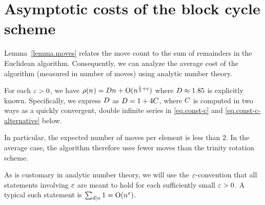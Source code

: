   \section{Asymptotic costs of the block cycle scheme}\label{sec.restglied}
  Lemma~\ref{lemma.moves} relates the move count to the sum of remainders
  in the Euclidean algorithm. Consequently, 
  we can analyze the average cost of the algorithm (measured in number
  of moves) using  analytic number theory. 
  \begin{theorem}\label{thm.main}
    For each $\varepsilon>0$, we have 
  $ 
      \rho(n_{})
      =
      D
      n_{}
      +
      \operatorname{O}(n_{}^{\frac12+\varepsilon})
  $  
    where
    $
      D
      \approx 1.85
    $
    is explicitly known. Specifically, we express $D$ as
    $D=1+4 C$, where $C$ is computed in
    two ways as a quickly convergent, double infinite series in
    \eqref{eq.const-c} and \eqref{eq.const-c-alternative} below.
  \end{theorem}
  
  \begin{remark}
    In particular, the expected number of moves per element is less
    than $2$. In the average case, the algorithm therefore uses fewer
    moves than the trinity rotation scheme. %
  \end{remark}
  
  
  As is customary in analytic number theory, we will use the
  $\varepsilon$-convention that all statements involving $\varepsilon$
  are meant to hold for each sufficiently small $\varepsilon>0$. A
  typical such statement is $\sum_{d \mid n} 1 = \operatorname{O}(n^\varepsilon)$.

